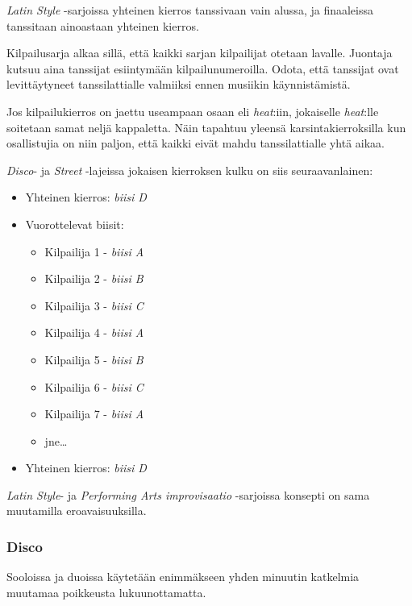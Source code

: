 \documentclass[12pt, a4paper, oneside]{article}
\begin{document}
\textit{Latin Style} -sarjoissa yhteinen kierros tanssivaan vain alussa,
ja finaaleissa tanssitaan ainoastaan yhteinen kierros.

Kilpailusarja alkaa sillä,
että kaikki sarjan kilpailijat otetaan lavalle.
Juontaja kutsuu aina tanssijat esiintymään kilpailunumeroilla.
Odota, että tanssijat ovat levittäytyneet tanssilattialle valmiiksi ennen musiikin käynnistämistä.

Jos kilpailukierros on jaettu useampaan osaan eli \textit{heat}:iin,
jokaiselle \textit{heat}:lle soitetaan samat neljä kappaletta.
Näin tapahtuu yleensä karsintakierroksilla kun osallistujia on niin paljon,
että kaikki eivät mahdu tanssilattialle yhtä aikaa.

\textit{Disco}- ja \textit{Street} -lajeissa jokaisen kierroksen kulku on siis seuraavanlainen:

\begin{itemize}[nosep]
    \item Yhteinen kierros: \textit{biisi D}
    \item Vuorottelevat biisit:
    \begin{itemize}
        \item Kilpailija 1 - \textit{biisi A}
        \item Kilpailija 2 - \textit{biisi B}
        \item Kilpailija 3 - \textit{biisi C}
        \item Kilpailija 4 - \textit{biisi A}
        \item Kilpailija 5 - \textit{biisi B}
        \item Kilpailija 6 - \textit{biisi C}
        \item Kilpailija 7 - \textit{biisi A}
        \item jne\ldots
    \end{itemize}
    \item Yhteinen kierros: \textit{biisi D}
\end{itemize}

\textit{Latin Style}- ja \textit{Performing Arts improvisaatio} -sarjoissa konsepti on sama muutamilla eroavaisuuksilla.

\subsubsection{Disco}

Sooloissa ja duoissa käytetään enimmäkseen yhden minuutin katkelmia muutamaa poikkeusta lukuunottamatta.
\end{document}
